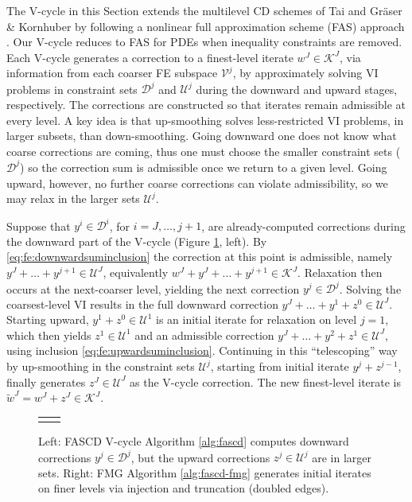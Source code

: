 \documentclass[review,hidelinks,onefignum,onetabnum,final]{siamart220329}  %
\begin{document}
The V-cycle in this Section extends the multilevel CD schemes of Tai \cite{Tai2003} and Gr\"aser \& Kornhuber \cite[Algorithm 4.2]{GraeserKornhuber2009} by following a nonlinear full approximation scheme (FAS) approach \cite{BrandtLivne2011}.  Our V-cycle reduces to FAS for PDEs when inequality constraints are removed.  Each V-cycle generates a correction to a finest-level iterate $w^J \in \mathcal{K}^J$, via information from each coarser FE subspace $\mathcal{V}^j$, by approximately solving VI problems in constraint sets $\mathcal{D}^j$ and $\mathcal{U}^j$ during the downward and upward stages, respectively.  The corrections are constructed so that iterates remain admissible at every level.  A key idea is that up-smoothing solves less-restricted VI problems, in larger subsets, than down-smoothing.  Going downward one does not know what coarse corrections are coming, thus one must choose the smaller constraint sets ($\mathcal{D}^j$) so the correction sum is admissible once we return to a given level.  Going upward, however, no further coarse corrections can violate admissibility, so we may relax in the larger sets $\mathcal{U}^j$.

Suppose that $y^i \in \mathcal{D}^i$, for $i=J,\dots,j+1$, are already-computed corrections during the downward part of the V-cycle (Figure \ref{fig:fascdcycles}, left).  By \eqref{eq:fe:downwardsuminclusion} the correction at this point is admissible, namely $y^J + \dots + y^{j+1} \in \mathcal{U}^J$, equivalently $w^J + y^J + \dots + y^{j+1} \in \mathcal{K}^J$.  Relaxation then occurs at the next-coarser level, yielding the next correction $y^j \in \mathcal{D}^j$.  Solving the coarsest-level VI results in the full downward correction $y^J + \dots + y^1 + z^0 \in \mathcal{U}^J$.  Starting upward, $y^1 + z^0 \in \mathcal{U}^1$ is an initial iterate for relaxation on level $j=1$, which then yields $z^1 \in \mathcal{U}^1$ and an admissible correction $y^J + \dots + y^2 + z^1 \in \mathcal{U}^J$, using inclusion \eqref{eq:fe:upwardsuminclusion}.  Continuing in this ``telescoping'' way by up-smoothing in the constraint sets $\mathcal{U}^j$, starting from initial iterate $y^j+z^{j-1}$, finally generates $z^J\in \mathcal{U}^J$ as the V-cycle correction.  The new finest-level iterate is $\tilde{w}^J = w^J + z^J \in \mathcal{K}^J$.

\begin{figure}[ht]
\centering
\begin{tabular}{cc}

&

\end{tabular}
\caption{Left: FASCD V-cycle Algorithm \ref{alg:fascd} computes downward corrections $y^j \in \mathcal{D}^j$, but the upward corrections $z^j\in\mathcal{U}^j$ are in larger sets. Right: FMG Algorithm \ref{alg:fascd-fmg} generates initial iterates on finer levels via injection and truncation (doubled edges).}
\label{fig:fascdcycles}
\end{figure}
\end{document}
